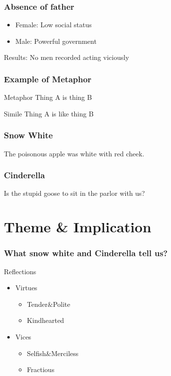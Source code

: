 \documentclass{beamer}
\begin{document}
\begin{frame}
    \frametitle{Absence of father}
    \Large
    \begin{itemize}
        \item Female: Low social status
        \item Male: Powerful government
    \end{itemize}
    \huge{\alert{Results: No men recorded acting viciously}}
\end{frame}

\begin{frame}
    \frametitle{Example of Metaphor}
    \Large
    \begin{block}{Metaphor}
        Thing A is thing B
    \end{block}


    \begin{block}{Simile}
        Thing A is like thing B
    \end{block}
\end{frame}

\begin{frame}
    \frametitle{Snow White}
    \huge{The poisonous apple was white with red cheek.}
\end{frame}

\begin{frame}
    \frametitle{Cinderella}
    \huge{Is the stupid goose to sit in the parlor with us?}
\end{frame}

\section{Theme \& Implication}
\begin{frame}
    \frametitle{What snow white and Cinderella tell us?}
    \Large
    \begin{block}{Reflections}
        \begin{itemize}
            \item Virtues
                  \begin{itemize}
                      \item Tender$\&$Polite
                      \item Kindhearted
                  \end{itemize}
            \item Vices
                  \begin{itemize}
                      \item Selfish$\&$Merciless
                      \item Fractious
                  \end{itemize}
        \end{itemize}
    \end{block}
\end{frame}
\end{document}

